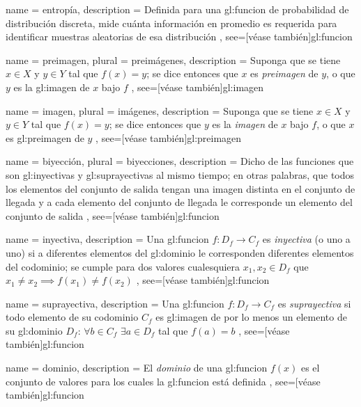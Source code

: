 {
  name = entropía,
  description = {
    Definida para una \gls{gl:funcion} de probabilidad de distribución discreta,
    mide cuánta información en promedio es requerida para identificar
    muestras aleatorias de esa distribución%
  },
  see=[véase también]{gl:funcion}
}

{
  name = preimagen,
  plural = preimágenes,
  description = {
    Suponga que se tiene $x \in X$ y $y \in Y$ tal que $f(x) = y$;
    se dice entonces que $x$ es \textit{preimagen} de $y$, o que
    $y$ es la \gls{gl:imagen} de $x$ bajo $f$%
  },
  see=[véase también]{gl:imagen}
}

{
  name = imagen,
  plural = imágenes,
  description = {
    Suponga que se tiene $x \in X$ y $y \in Y$ tal que $f(x) = y$;
    se dice entonces que $y$ es la \textit{imagen} de $x$ bajo $f$,
    o que $x$ es \gls{gl:preimagen} de $y$%
  },
  see=[véase también]{gl:preimagen}
}

{
  name = biyección,
  plural = biyecciones,
  description = {
    Dicho de las funciones que son \glspl{gl:inyectiva} y
    \glspl{gl:suprayectiva} al mismo tiempo; en otras palabras, que todos los
    elementos del conjunto de salida tengan una imagen distinta en el conjunto
    de llegada y a cada elemento del conjunto de llegada le corresponde
    un elemento del conjunto de salida%
  },
  see=[véase también]{gl:funcion}
}

{
  name = inyectiva,
  description = {
    Una \gls{gl:funcion} $f:D_f \rightarrow C_f$ es \textit{inyectiva} (o uno a
    uno) si a diferentes elementos del \gls{gl:dominio} le corresponden
    diferentes elementos del codominio; se cumple para dos
    valores cualesquiera $x_1, x_2 \in D_f$ que
    $x_1 \neq x_2 \implies f(x_1) \neq f(x_2)$%
  },
  see=[véase también]{gl:funcion}
}

{
  name = suprayectiva,
  description = {
    Una \gls{gl:funcion} $f:D_f \rightarrow C_f$ es \textit{suprayectiva} si
    todo elemento de su codominio $C_f$ es \gls{gl:imagen} de
    por lo menos un elemento de su \gls{gl:dominio} $D_f$: $\forall b \in C_f$
    $\exists a \in D_f$ tal que $f(a)=b$%
  },
  see=[véase también]{gl:funcion}
}

{
  name = dominio,
  description = {
    El \textit{dominio} de una \gls{gl:funcion} $f(x)$ es el conjunto de
    valores para los cuales la \gls{gl:funcion} está definida%
  },
  see=[véase también]{gl:funcion}
}

